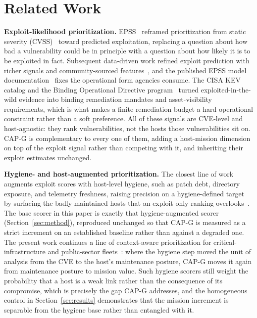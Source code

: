 \section{Related Work}
\label{sec:related}

\textbf{Exploit-likelihood prioritization.} EPSS~\cite{jacobs2021epss} reframed prioritization
from static severity (CVSS)~\cite{cvss31} toward predicted exploitation, replacing a question
about how bad a vulnerability could be in principle with a question about how likely it is to be
exploited in fact. Subsequent data-driven work refined exploit prediction with richer signals and
community-sourced features~\cite{jacobs2023enhancing}, and the published EPSS model
documentation~\cite{firstepss} fixes the operational form agencies consume. The CISA KEV catalog
and the Binding Operational Directive program~\cite{cisakev,cisabod2201,cisabod2301} turned
exploited-in-the-wild evidence into binding remediation mandates and asset-visibility
requirements, which is what makes a finite remediation budget a hard operational constraint rather
than a soft preference. All of these signals are CVE-level and host-agnostic: they rank
vulnerabilities, not the hosts those vulnerabilities sit on. CAP-G is complementary to every one
of them, adding a host-mission dimension on top of the exploit signal rather than competing with
it, and inheriting their exploit estimates unchanged.

\textbf{Hygiene- and host-augmented prioritization.} The closest line of work augments exploit
scores with host-level hygiene, such as patch debt, directory exposure, and telemetry freshness,
raising precision on a hygiene-defined target by surfacing the badly-maintained hosts that an
exploit-only ranking overlooks~\cite{paper4hygieneprio}. The base scorer in this paper is exactly
that hygiene-augmented scorer (Section~\ref{sec:method}), reproduced unchanged so that CAP-G is
measured as a strict increment on an established baseline rather than against a degraded one. The
present work continues a line of context-aware prioritization for critical-infrastructure
and public-sector fleets~\cite{paper1vulnprio}: where the hygiene step moved the unit of analysis from the CVE to
the host's maintenance posture, CAP-G moves it again from maintenance posture to mission value.
Such hygiene scorers still weight the probability that a host is a weak link rather than the
consequence of its compromise, which is precisely the gap CAP-G addresses, and the homogeneous
control in Section~\ref{sec:results} demonstrates that the mission increment is separable from the
hygiene base rather than entangled with it.

